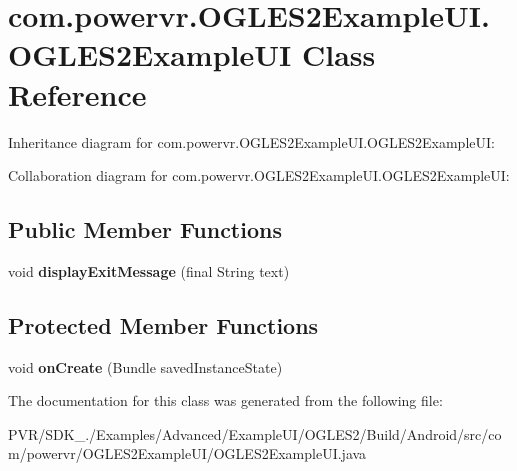 \hypertarget{classcom_1_1powervr_1_1_o_g_l_e_s2_example_u_i_1_1_o_g_l_e_s2_example_u_i}{\section{com.\+powervr.\+O\+G\+L\+E\+S2\+Example\+U\+I.\+O\+G\+L\+E\+S2\+Example\+U\+I Class Reference}
\label{classcom_1_1powervr_1_1_o_g_l_e_s2_example_u_i_1_1_o_g_l_e_s2_example_u_i}
}


Inheritance diagram for com.\+powervr.\+O\+G\+L\+E\+S2\+Example\+U\+I.\+O\+G\+L\+E\+S2\+Example\+U\+I\+:


Collaboration diagram for com.\+powervr.\+O\+G\+L\+E\+S2\+Example\+U\+I.\+O\+G\+L\+E\+S2\+Example\+U\+I\+:
\subsection*{Public Member Functions}
\begin{DoxyCompactItemize}
\item 
\hypertarget{classcom_1_1powervr_1_1_o_g_l_e_s2_example_u_i_1_1_o_g_l_e_s2_example_u_i_ac577c27f8153aa5276514d199b7338e2}{void {\bfseries display\+Exit\+Message} (final String text)}\label{classcom_1_1powervr_1_1_o_g_l_e_s2_example_u_i_1_1_o_g_l_e_s2_example_u_i_ac577c27f8153aa5276514d199b7338e2}

\end{DoxyCompactItemize}
\subsection*{Protected Member Functions}
\begin{DoxyCompactItemize}
\item 
\hypertarget{classcom_1_1powervr_1_1_o_g_l_e_s2_example_u_i_1_1_o_g_l_e_s2_example_u_i_aa7fe952ec86119d6cad71e469a35aa3c}{void {\bfseries on\+Create} (Bundle saved\+Instance\+State)}\label{classcom_1_1powervr_1_1_o_g_l_e_s2_example_u_i_1_1_o_g_l_e_s2_example_u_i_aa7fe952ec86119d6cad71e469a35aa3c}

\end{DoxyCompactItemize}


The documentation for this class was generated from the following file\+:\begin{DoxyCompactItemize}
\item 
P\+V\+R/\+S\+D\+K\+\_./\+Examples/\+Advanced/\+Example\+U\+I/\+O\+G\+L\+E\+S2/\+Build/\+Android/src/com/powervr/\+O\+G\+L\+E\+S2\+Example\+U\+I/O\+G\+L\+E\+S2\+Example\+U\+I.\+java\end{DoxyCompactItemize}
